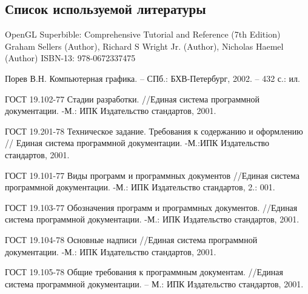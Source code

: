 \subsection{Список используемой литературы}
\begin{my_enumerate}
\item
OpenGL Superbible: Comprehensive Tutorial and Reference (7th Edition)
Graham Sellers (Author), Richard S Wright Jr. (Author), Nicholas Haemel (Author)
ISBN-13: 978-0672337475

\item
Порев В.Н. Компьютерная графика. – СПб.: БХВ-Петербург, 2002. – 432 с.: ил.

\item
ГОСТ 19.102-77 Стадии разработки. //Единая система программной документации. -М.: ИПК Издательство стандартов, 2001.

\item
ГОСТ 19.201-78 Техническое задание. Требования к содержанию и оформлению // Единая система программной документации. -М.:ИПК Издательство стандартов, 2001.

\item
ГОСТ 19.101-77 Виды программ и программных документов
//Единая система программной документации. -М.: ИПК Издательство стандартов, 2.: 001.

\item
ГОСТ 19.103-77 Обозначения программ и программных документов. //Единая система программной документации. -М.: ИПК Издательство стандартов, 2001.

\item
ГОСТ 19.104-78 Основные надписи //Единая система программной документации. -М.: ИПК Издательство стандартов, 2001.

\item 
ГОСТ 19.105-78 Общие требования к программным документам. //Единая система
программной документации. – М.: ИПК Издательство стандартов, 2001.

\end{my_enumerate}

